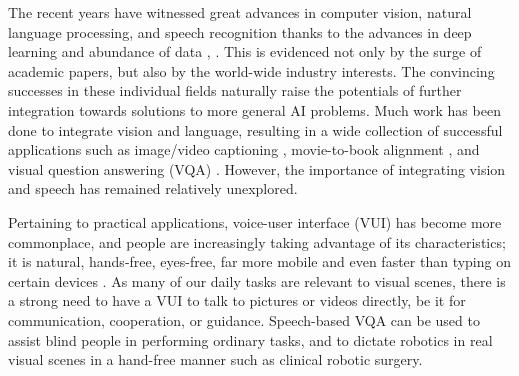 \documentclass[letterpaper]{article} %
\begin{document}
The recent years have witnessed great advances in computer vision, natural language processing, and speech recognition thanks to the advances in deep learning \cite{lecun2015deep} and abundance of data \cite{imagenet:2015}, \cite{VQA}. This is evidenced not only by the surge of academic papers, but also by the world-wide industry interests. The convincing successes in these individual fields naturally raise the potentials of further integration towards solutions to more general AI problems. Much work has been done to integrate vision and language, resulting in a wide collection of successful applications such as image/video captioning \cite{show:tell:caption}, movie-to-book alignment \cite{align:bookmovie}, and visual question answering (VQA) \cite{VQA}. However, the importance of integrating vision and speech has remained relatively unexplored.

Pertaining to practical applications, voice-user interface (VUI) has become more commonplace, and people are increasingly taking advantage of its characteristics; it is natural, hands-free, eyes-free, far more mobile and even faster than typing on certain devices \cite{speech:faster}. As many of our daily tasks are relevant to visual scenes, there is a strong need to have a VUI to talk to pictures or videos directly, be it for communication, cooperation, or guidance. Speech-based VQA can be used to assist blind people in performing ordinary tasks, and to dictate robotics in real visual scenes in a hand-free manner such as clinical robotic surgery.
\end{document}
